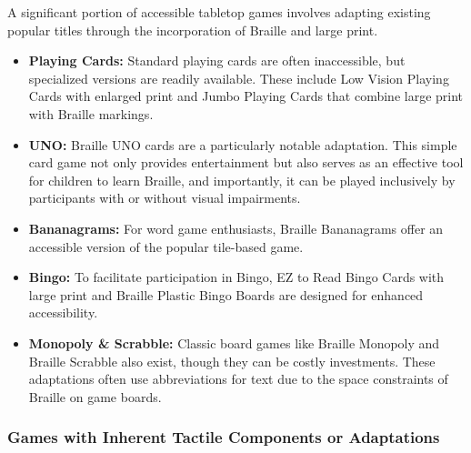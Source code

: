 A significant portion of accessible tabletop games involves adapting existing popular titles through the incorporation of Braille and large print.
\begin{itemize}
    \item \textbf{Playing Cards:} Standard playing cards are often inaccessible, but specialized versions are readily available. These include Low Vision Playing Cards with enlarged print and Jumbo Playing Cards that combine large print with Braille markings\supercite{CarrollCenterGames}.
    \item \textbf{UNO:} Braille UNO cards are a particularly notable adaptation. This simple card game not only provides entertainment but also serves as an effective tool for children to learn Braille, and importantly, it can be played inclusively by participants with or without visual impairments\supercite{CarrollCenterGames}.
    \item \textbf{Bananagrams:} For word game enthusiasts, Braille Bananagrams offer an accessible version of the popular tile-based game\supercite{CarrollCenterGames}.
    \item \textbf{Bingo:} To facilitate participation in Bingo, EZ to Read Bingo Cards with large print and Braille Plastic Bingo Boards are designed for enhanced accessibility\supercite{CarrollCenterGames}.
    \item \textbf{Monopoly \& Scrabble:} Classic board games like Braille Monopoly and Braille Scrabble also exist, though they can be costly investments\supercite{NFBBoardGames}. These adaptations often use abbreviations for text due to the space constraints of Braille on game boards\supercite{NFBBoardGames}.
\end{itemize}

\subsubsection{Games with Inherent Tactile Components or Adaptations}

